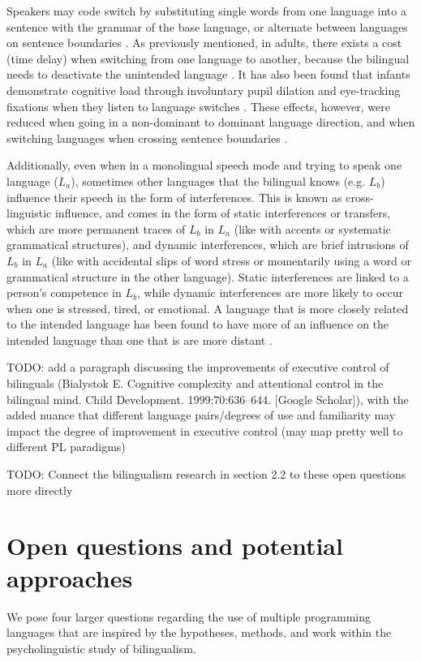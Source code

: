 \documentclass[a4paper,UKenglish,cleveref, autoref]{oasics-v2019}
\begin{document}
Speakers may code switch by substituting single words from one language into a sentence with the grammar of the base language, or alternate between languages on sentence boundaries \cite{pl0034}. As previously mentioned, in adults, there exists a cost (time delay) when switching from one language to another, because the bilingual needs to deactivate the unintended language \cite{pl0050}. It has also been found that infants demonstrate cognitive load through involuntary pupil dilation and eye-tracking fixations when they listen to language switches \cite{pl0028}. These effects, however, were reduced when going in a non-dominant to dominant language direction, and when switching languages when crossing sentence boundaries \cite{pl0028}. 

Additionally, even when in a monolingual speech mode and trying to speak one language ($L_a$), sometimes other languages that the bilingual knows (e.g. $L_b$) influence their speech in the form of interferences. This is known as cross-linguistic influence, and comes in the form of static interferences or transfers, which are more permanent traces of $L_b$ in $L_a$ (like with accents or systematic grammatical structures), and dynamic interferences, which are brief intrusions of $L_b$ in $L_a$ (like with accidental slips of word stress or momentarily using a word or grammatical structure in the other language). Static interferences are linked to a person’s competence in $L_b$, while dynamic interferences are more likely to occur when one is stressed, tired, or emotional. A language that is more closely related to the intended language has been found to have more of an influence on the intended language than one that is are more distant \cite{pl0011}. 

TODO: add a paragraph discussing the improvements of executive control of bilinguals (Bialystok E. Cognitive complexity and attentional control in the bilingual mind. Child Development. 1999;70:636–644. [Google Scholar]), with the added nuance that different language pairs/degrees of use and familiarity may impact the degree of improvement in executive control (may map pretty well to different PL paradigms) 


TODO: Connect the bilingualism research in section 2.2 to these open questions more directly 

\section{Open questions and potential approaches}
We pose four larger questions regarding the use of multiple programming languages that are inspired by the hypotheses, methods, and work within the psycholinguistic study of bilingualism. 
\end{document}
